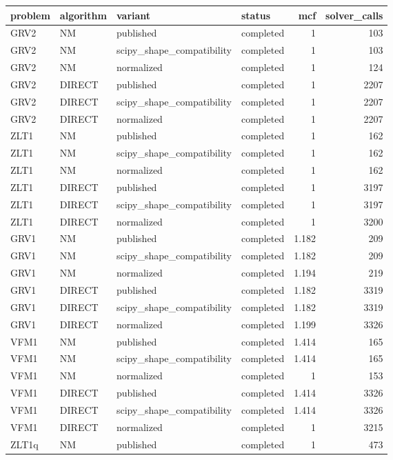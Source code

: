 \begin{tabular}{llllrr}
\toprule
problem & algorithm & variant & status & mcf & solver\_calls \\
\midrule
GRV2 & NM & published & completed & 1 & 103 \\
GRV2 & NM & scipy\_shape\_compatibility & completed & 1 & 103 \\
GRV2 & NM & normalized & completed & 1 & 124 \\
GRV2 & DIRECT & published & completed & 1 & 2207 \\
GRV2 & DIRECT & scipy\_shape\_compatibility & completed & 1 & 2207 \\
GRV2 & DIRECT & normalized & completed & 1 & 2207 \\
ZLT1 & NM & published & completed & 1 & 162 \\
ZLT1 & NM & scipy\_shape\_compatibility & completed & 1 & 162 \\
ZLT1 & NM & normalized & completed & 1 & 162 \\
ZLT1 & DIRECT & published & completed & 1 & 3197 \\
ZLT1 & DIRECT & scipy\_shape\_compatibility & completed & 1 & 3197 \\
ZLT1 & DIRECT & normalized & completed & 1 & 3200 \\
GRV1 & NM & published & completed & 1.182 & 209 \\
GRV1 & NM & scipy\_shape\_compatibility & completed & 1.182 & 209 \\
GRV1 & NM & normalized & completed & 1.194 & 219 \\
GRV1 & DIRECT & published & completed & 1.182 & 3319 \\
GRV1 & DIRECT & scipy\_shape\_compatibility & completed & 1.182 & 3319 \\
GRV1 & DIRECT & normalized & completed & 1.199 & 3326 \\
VFM1 & NM & published & completed & 1.414 & 165 \\
VFM1 & NM & scipy\_shape\_compatibility & completed & 1.414 & 165 \\
VFM1 & NM & normalized & completed & 1 & 153 \\
VFM1 & DIRECT & published & completed & 1.414 & 3326 \\
VFM1 & DIRECT & scipy\_shape\_compatibility & completed & 1.414 & 3326 \\
VFM1 & DIRECT & normalized & completed & 1 & 3215 \\
ZLT1q & NM & published & completed & 1 & 473 \\

\end{tabular}
